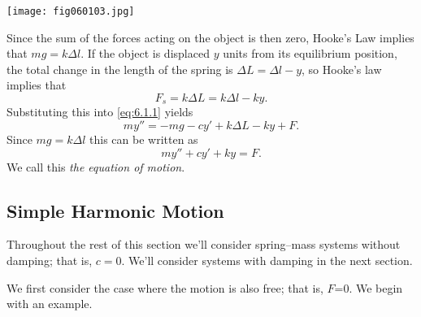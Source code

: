 \documentclass{ximera}
\begin{document}
\begin{image}
  \texttt{[image: fig060103.jpg]}
\end{image}
 
Since the sum of the forces acting on the object
is then zero, Hooke's Law implies that $mg=k\Delta l$. If the object
is displaced $y$ units from its equilibrium position, the total
change in the length of the spring is $\Delta L=\Delta l-y$,
 so Hooke's law implies that
 $$
F_s=k\Delta L=k\Delta l-ky.
$$
Substituting this into \eqref{eq:6.1.1} yields
$$
my''=-mg-cy'+k\Delta L-ky+F.
$$
Since $mg=k\Delta l$ this can be written as
\begin{equation}\label{eq:6.1.2}
my''+cy'+ky=F.
\end{equation}
We call this \textit{the equation of motion}.
 
 
\subsection*{Simple Harmonic Motion}
 
Throughout the rest of this section we'll consider spring--mass
systems without damping; that is, $c=0$. We'll consider systems with
damping in the next section.
 
We first consider the case where the motion is also free; that is,
$F$=0. We begin with an example.
 
\end{document}
